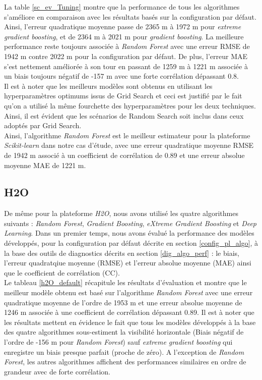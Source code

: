 La table \ref{sc_ev_Tuning} montre que la performance de tous les algorithmes s'améliore en comparaison avec les résultats basés sur la configuration par défaut. Ainsi, l'erreur quadratique moyenne passe de 2365 m à 1972 m pour \textit{extreme gradient boosting}, et de 2364 m à 2021 m pour \textit{gradient boosting}. La meilleure performance reste toujours associée à \textit{Random Forest} avec une erreur RMSE de 1942 m contre 2022 m pour la configuration par défaut. De plus, l'erreur MAE s'est nettement améliorée à son tour en passant de 1259 m à 1221 m associée à un biais toujours négatif de -157 m avec une forte corrélation dépassant 0.8.\\

Il est à noter que les meilleurs modèles sont obtenus en utilisant les hyperparamètres optimums issus de Grid Search et ceci est justifié par le fait qu'on a utilisé la même fourchette des hyperparamètres pour les deux techniques. Ainsi, il est évident que les scénarios de Random Search soit inclus dans ceux adoptés par Grid Search.\\

 Ainsi, l'algorithme \textit{Random Forest} est le meilleur estimateur pour la plateforme \textit{Scikit-learn} dans notre cas d'étude, avec une erreur quadratique moyenne RMSE de 1942 m associé à un coefficient de corrélation de 0.89 et une erreur absolue moyenne MAE de 1221 m.

\subsection*{H2O}
De même pour la plateforme \textit{H2O}, nous avons utilisé les quatre algorithmes suivants : \textit{Random Forest}, \textit{Gradient Boosting}, \textit{eXtreme Gradient Boosting} et \textit{Deep Learning}. Dans un premier temps, nous avons évalué la performance des modèles développés, pour la configuration par défaut décrite en section \ref{config_pl_algo}, à la base des outils de diagnostics décrits en section \ref{dig_algo_perf} : le biais, l'erreur quadratqiue moyenne (RMSE) et l'erreur absolue moyenne (MAE) ainsi que le coefficient de corrélation (CC).\\ 

Le tableau \ref{h2O_default} récapitule les résultats d'évaluation et montre que le meilleur modèle obtenu est basé sur l'algorithme \textit{Random Forest} avec une erreur quadratique moyenne de l'ordre de 1953 m et une erreur absolue moyenne de 1246 m associée à une coefficient de corrélation dépassant 0.89. Il est à noter que les résultats mettent en évidence le fait que tous les modèles développés à la base des quatre algorithmes sous-estiment la visibilité horizontale (Biais négatif de l'ordre de -156 m pour \textit{Random Forest}) sauf \textit{extreme gradient boosting} qui enregistre un biais presque parfait (proche de zéro). A l'exception de \textit{Random Forest}, les autres algorithmes affichent des performances similaires en ordre de grandeur avec de forte corrélation. \\ 
  
